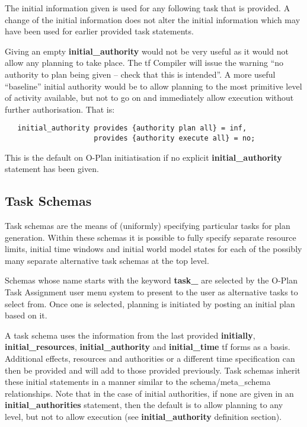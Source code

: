 The initial information given is used for any following task that is provided.
A change of the initial information does not alter the initial
information which may have been used for earlier provided task statements.

Giving an empty {\bf initial\_authority} would not be very useful as it would
not allow any planning to take place.  The {\sc tf} Compiler will issue the
warning ``no authority to plan being given -- check that this is intended''.
A more useful ``baseline'' initial authority would be to allow planning to the
most primitive level of activity available, but not to go on and immediately
allow execution without further authorisation.  That is:

\begin{verbatim}
   initial_authority provides {authority plan all} = inf,
                     provides {authority execute all} = no;
\end{verbatim}

This is the default on O-Plan initiatisation if no explicit {\bf
initial\_authority} statement has been given.

\subsection{Task Schemas}

Task schemas are the means of (uniformly) specifying particular tasks for plan
generation. Within these schemas it is possible to fully specify separate
resource limits, initial time windows and initial world model states for each
of the possibly many separate alternative task schemas at the top level.

Schemas whose name starts with the keyword {\bf task\_} are selected by the
O-Plan Task Assignment user menu system to present to the user as alternative
tasks to select from.  Once one is selected, planning is initiated by posting
an initial plan based on it.

A task schema uses the information from the last provided {\bf initially},
{\bf initial\_resources}, {\bf initial\_authority} and {\bf initial\_time}
{\sc tf} forms as a basis.  Additional effects, resources and authorities or a
different time specification can then be provided and will add to those
provided previously.  Task schemas inherit these initial statements in a
manner similar to the schema/meta\_schema relationships.
Note that in the case of initial authorities, if none are given in an
{\bf initial\_authorities} statement, then the default is to allow planning
to any level, but not to allow execution (see {\bf initial\_authority}
definition section).

